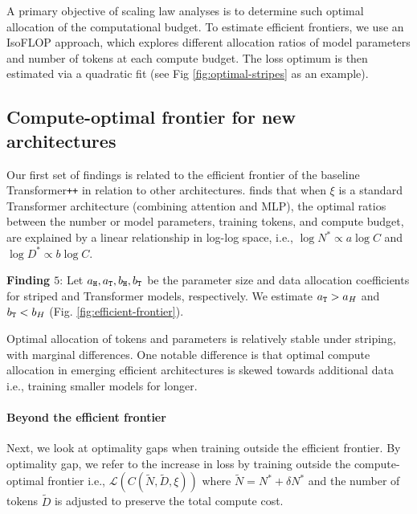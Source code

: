 A primary objective of scaling law analyses is to determine such optimal allocation of the computational budget. To estimate efficient frontiers, we use an IsoFLOP approach, which explores different allocation ratios of model parameters and number of tokens at each compute budget. The loss optimum is then estimated via a quadratic fit (see Fig \ref{fig:optimal-stripes} as an example).

\subsection{Compute-optimal frontier for new architectures}

Our first set of findings is related to the efficient frontier of the baseline Transformer{\tt ++} \cite{touvron2023llama} in relation to other architectures. \cite{hoffmann2022training} finds that when $\xi$ is a standard Transformer architecture (combining attention and MLP), the optimal ratios between the number or model parameters, training tokens, and compute budget, are explained by a linear relationship in log-log space, i.e., $\log N^* \propto a \log C$ and $\log D^* \propto b \log C$.

\begin{tcolorbox}[enhanced, frame hidden, sharp corners, colback=blue!5, boxsep=2pt, before skip=1pt, after skip=1pt]
   \textbf{Finding $5$}: Let $a_{\tt H}, a_{\tt T}, b_{\tt H}, b_{\tt T}$ be the parameter size and data allocation coefficients for striped and Transformer models, respectively. We estimate $a_{\tt T} > a_{H}$ and $b_{\tt T} < b_{H}$ (Fig. \ref{fig:efficient-frontier}).
\end{tcolorbox}

Optimal allocation of tokens and parameters is relatively stable under striping, with marginal differences. One notable difference is that optimal compute allocation in emerging efficient architectures is skewed towards additional data i.e., training smaller models for longer.

\paragraph{Beyond the efficient frontier}

Next, we look at optimality gaps when training outside the efficient frontier. By optimality gap, we refer to the increase in loss by training outside the compute-optimal frontier i.e., $\mathcal{L}(C(\tilde{N},\tilde{D},\xi))$ where $\tilde{N} = N^* + \delta N^*$ and the number of tokens $\tilde{D}$ is adjusted to preserve the total compute cost.

